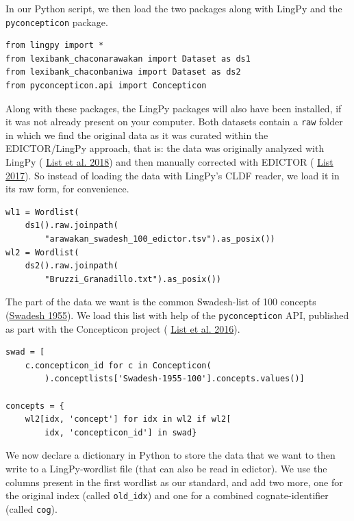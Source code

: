 \documentclass[
  a4paper,
  14pt,
  oneside,
  tablecaptionabove
]{scrbook}
\begin{document}
In our Python script, we then load the two packages along with LingPy
and the \lstinline!pyconcepticon! package.

\begin{lstlisting}[basicstyle=\small]
from lingpy import *
from lexibank_chaconarawakan import Dataset as ds1
from lexibank_chaconbaniwa import Dataset as ds2
from pyconcepticon.api import Concepticon
\end{lstlisting}

Along with these packages, the LingPy packages will also have been
installed, if it was not already present on your computer. Both datasets
contain a \lstinline!raw! folder in which we find the original data as
it was curated within the EDICTOR/LingPy approach, that is: the data was
originally analyzed with LingPy (
\href{http://bibliography.lingpy.org?key=List2018i}{List et al. 2018})
and then manually corrected with EDICTOR (
\href{http://bibliography.lingpy.org?key=List2017d}{List 2017}). So
instead of loading the data with LingPy's CLDF reader, we load it in its
raw form, for convenience.

\begin{lstlisting}[basicstyle=\small]
wl1 = Wordlist(
    ds1().raw.joinpath(
        "arawakan_swadesh_100_edictor.tsv").as_posix()) 
wl2 = Wordlist(
    ds2().raw.joinpath(
        "Bruzzi_Granadillo.txt").as_posix())
\end{lstlisting}

The part of the data we want is the common Swadesh-list of 100 concepts
(\href{http://bibliography.lingpy.org?key=Swadesh1955}{Swadesh 1955}).
We load this list with help of the \lstinline!pyconcepticon! API,
published as part with the Concepticon project (
\href{http://bibliography.lingpy.org?key=List2016a}{List et al. 2016}).

\begin{lstlisting}[basicstyle=\small]
swad = [
    c.concepticon_id for c in Concepticon(
        ).conceptlists['Swadesh-1955-100'].concepts.values()]

concepts = {
    wl2[idx, 'concept'] for idx in wl2 if wl2[
        idx, 'concepticon_id'] in swad}
\end{lstlisting}

We now declare a dictionary in Python to store the data that we want to
then write to a LingPy-wordlist file (that can also be read in edictor).
We use the columns present in the first wordlist as our standard, and
add two more, one for the original index (called \lstinline!old_idx!)
and one for a combined cognate-identifier (called \lstinline!cog!).
\end{document}
